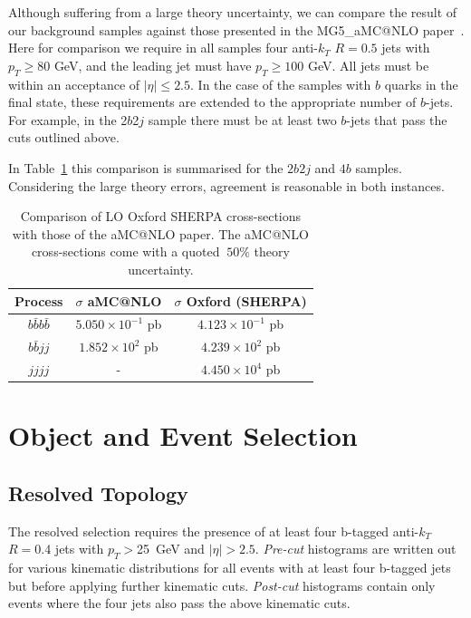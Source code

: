 \documentclass[12pt]{article}
\begin{document}
Although suffering from a large theory uncertainty, we can compare the result of our background samples against those presented in the MG5\_aMC@NLO paper~\cite{Alwall:2014hca}.
Here for comparison we require in all samples four anti-$k_T$ $R=0.5$ jets with $p_T \ge 80 $ GeV, and the leading jet must have $p_T \ge 100$ GeV. All jets must be within an acceptance of $|\eta| \le 2.5 $. In the case of the samples with $b$ quarks in the final state, these requirements are extended to the appropriate number of $b$-jets. For example, in the 2$b$2$j$ sample there must be at least two $b$-jets that pass the cuts outlined above.

In Table~\ref{tab:xsecs} this comparison is summarised for the $2b2j$ and $4b$ samples. Considering the large theory errors, agreement is reasonable in both instances.

\begin{table}[h]
\begin{center}
\begin{tabular}{|c|c|c|}
\hline
Process & $\sigma$ aMC@NLO & $\sigma$ Oxford (SHERPA) \\
\hline\hline
$b\bar{b}b\bar{b}$ & $5.050 \times  10^{-1}$ pb & $4.123\times10^{-1}$ pb \\ 
$b\bar{b}jj$ & $1.852 \times 10^2$ pb &$4.239 \times 10^2$ pb \\ 
$jjjj$ & -  & $4.450\times 10^4$ pb \\
\hline
\end{tabular}
\caption{Comparison of LO Oxford SHERPA cross-sections with those of the aMC@NLO paper. The aMC@NLO cross-sections come with a quoted $~50\%$ theory uncertainty.} \label{tab:xsecs}
\end{center}
\end{table}%
\section{Object and Event Selection}

\subsection{Resolved Topology}

The resolved selection requires the presence of at least four b-tagged anti-$k_T$ $R=0.4$ jets with $p_T >$25~GeV and $|\eta|>2.5$.
\textit{Pre-cut} histograms are written out for various kinematic distributions for all events with at least four b-tagged jets but before applying
further kinematic cuts. \textit{Post-cut} histograms contain only events where the four jets also pass the above kinematic cuts.
\end{document}

